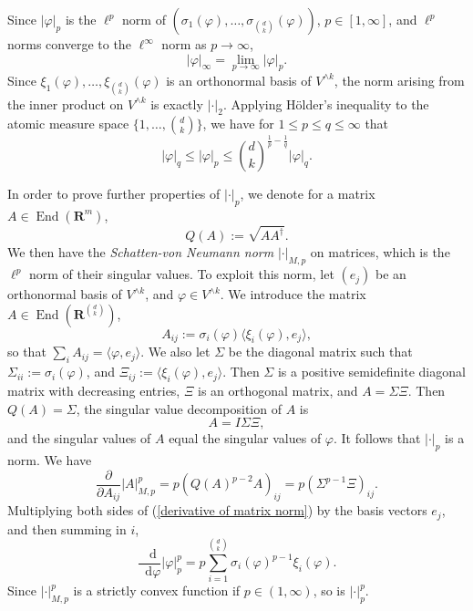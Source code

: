 \documentclass[reqno,11pt]{amsart}
\newcommand{\RR}{\mathbf{R}}
\newcommand*\dif{\mathop{}\!\mathrm{d}}
\DeclareMathOperator{\End}{End}
\newcommand{\dfn}[1]{\emph{#1}\index{#1}}
\theoremstyle{definition}
\numberwithin{equation}{section}
\begin{document}
Since $|\varphi|_p$ is the $\ell^p$ norm of $(\sigma_1(\varphi), \dots, \sigma_{\binom dk}(\varphi))$, $p \in [1, \infty]$, and $\ell^p$ norms converge to the $\ell^\infty$ norm as $p \to \infty$,
\begin{equation}\label{SvN norms converge}
|\varphi|_\infty = \lim_{p \to \infty} |\varphi|_p.
\end{equation}
Since $\xi_1(\varphi), \dots, \xi_{\binom dk}(\varphi)$ is an orthonormal basis of $V^{\wedge k}$, the norm arising from the inner product on $V^{\wedge k}$ is exactly $|\cdot|_2$.
Applying H\"older's inequality to the atomic measure space $\{1, \dots, \binom dk\}$, we have for $1 \leq p \leq q \leq \infty$ that
\begin{equation}\label{relating Schatten norms}
|\varphi|_q \leq |\varphi|_p \leq \binom dk^{\frac{1}{p} - \frac{1}{q}} |\varphi|_q.
\end{equation}

In order to prove further properties of $|\cdot|_p$, we denote for a matrix $A \in \End(\RR^m)$,
$$Q(A) := \sqrt{AA^\dagger}.$$
We then have the \dfn{Schatten-von Neumann norm} $|\cdot|_{M, p}$ on matrices, which is the $\ell^p$ norm of their singular values.
To exploit this norm, let $(e_j)$ be an orthonormal basis of $V^{\wedge k}$, and $\varphi \in V^{\wedge k}$.
We introduce the matrix $A \in \End(\RR^{\binom dk})$,
$$A_{ij} := \sigma_i(\varphi) \langle \xi_i(\varphi), e_j\rangle,$$
so that $\sum_i A_{ij} = \langle \varphi, e_j\rangle$.
We also let $\Sigma$ be the diagonal matrix such that $\Sigma_{ii} := \sigma_i(\varphi)$,
and $\Xi_{ij} := \langle \xi_i(\varphi), e_j\rangle$.
Then $\Sigma$ is a positive semidefinite diagonal matrix with decreasing entries, $\Xi$ is an orthogonal matrix, and $A = \Sigma \Xi$.
Then $Q(A) = \Sigma$, the singular value decomposition of $A$ is 
$$A = I \Sigma \Xi,$$
and the singular values of $A$ equal the singular values of $\varphi$.
It follows that $|\cdot|_p$ is a norm.
We have 
\begin{equation}\label{derivative of matrix norm}
\frac{\partial}{\partial A_{ij}} |A|_{M, p}^p = p(Q(A)^{p - 2} A)_{ij} = p(\Sigma^{p - 1} \Xi)_{ij}.
\end{equation}
Multiplying both sides of (\ref{derivative of matrix norm}) by the basis vectors $e_j$, and then summing in $i$,
\begin{equation}\label{derivative of schatten norm}
\frac{\dif}{\dif \varphi} |\varphi|_p^p = p \sum_{i=1}^{\binom dk} \sigma_i(\varphi)^{p - 1} \xi_i(\varphi).
\end{equation}
Since $|\cdot|_{M, p}^p$ is a strictly convex function if $p \in (1, \infty)$, so is $|\cdot|_p^p$.
\end{document}
